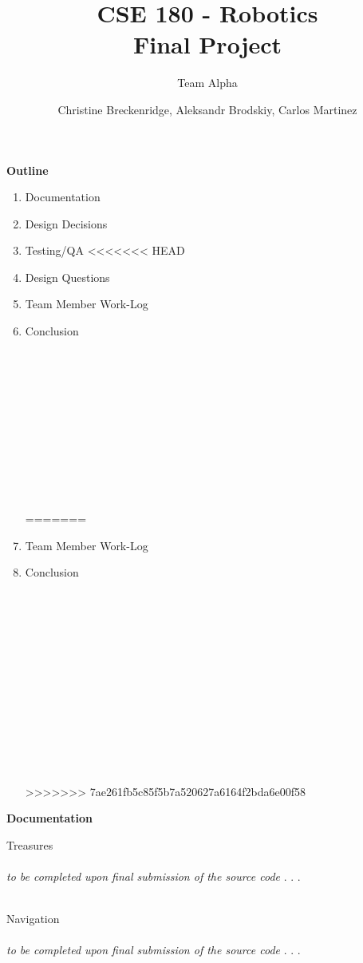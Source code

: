 \documentclass[12pt]{article}
\title{CSE 180 - Robotics \\ Final Project}
\subtitle{Team Alpha}
\author{Christine Breckenridge, Aleksandr Brodskiy, Carlos Martinez}
\begin{document}
\maketitle
{\setlength{\parindent}{0cm}
\textbf{Outline}
\begin{enumerate}  
\item Documentation
\item Design Decisions
\item Testing/QA
<<<<<<< HEAD
\item Design Questions
\item Team Member Work-Log
\item Conclusion\\\\\\\\\\\\\\\\\\\\\\\\
=======
\item Team Member Work-Log
\item Conclusion\\\\\\\\\\\\\\\\\\\\\\\\\\\\
>>>>>>> 7ae261fb5c85f5b7a520627a6164f2bda6e00f58
\end{enumerate} 
}
{\setlength{\parindent}{0cm}
\textbf{Documentation} \\
\begin{center}Treasures\end{center}
\paragraph{} \textit{to be completed upon final submission of the source code} . . . \\\\
\begin{center}Navigation\end{center}
\paragraph{} \textit{to be completed upon final submission of the source code} . . . \\\\
}
\end{document}
